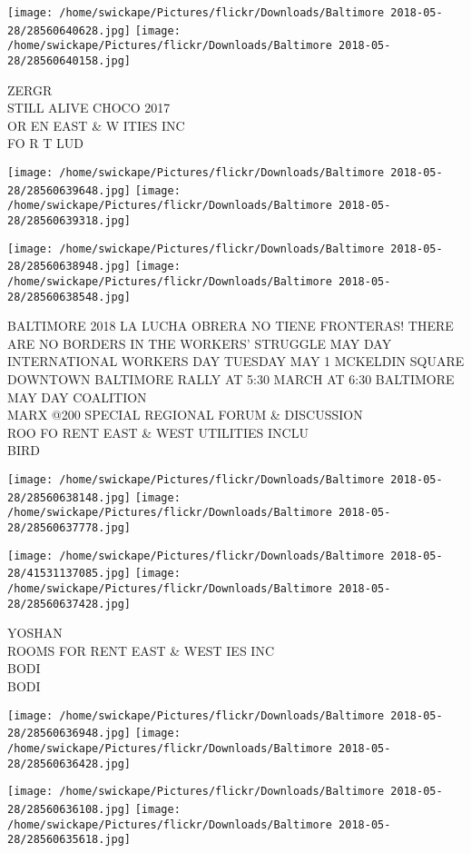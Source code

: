\documentclass[10pt,letterpaper]{article}
\begin{document}
\texttt{[image: /home/swickape/Pictures/flickr/Downloads/Baltimore 2018-05-28/28560640628.jpg]}
\texttt{[image: /home/swickape/Pictures/flickr/Downloads/Baltimore 2018-05-28/28560640158.jpg]}

ZERGR\\
STILL ALIVE CHOCO 2017\\
OR EN EAST \& W ITIES INC\\
FO R T LUD
\pagebreak

\texttt{[image: /home/swickape/Pictures/flickr/Downloads/Baltimore 2018-05-28/28560639648.jpg]}
\texttt{[image: /home/swickape/Pictures/flickr/Downloads/Baltimore 2018-05-28/28560639318.jpg]}

\texttt{[image: /home/swickape/Pictures/flickr/Downloads/Baltimore 2018-05-28/28560638948.jpg]}
\texttt{[image: /home/swickape/Pictures/flickr/Downloads/Baltimore 2018-05-28/28560638548.jpg]}

BALTIMORE 2018 LA LUCHA OBRERA NO TIENE FRONTERAS!  THERE ARE NO BORDERS IN THE WORKERS' STRUGGLE MAY DAY INTERNATIONAL WORKERS DAY TUESDAY MAY 1 MCKELDIN SQUARE DOWNTOWN BALTIMORE RALLY AT 5:30 MARCH AT 6:30 BALTIMORE MAY DAY COALITION\\
MARX @200 SPECIAL REGIONAL FORUM \& DISCUSSION\\
ROO FO RENT EAST \& WEST UTILITIES INCLU\\
BIRD
\pagebreak

\texttt{[image: /home/swickape/Pictures/flickr/Downloads/Baltimore 2018-05-28/28560638148.jpg]}
\texttt{[image: /home/swickape/Pictures/flickr/Downloads/Baltimore 2018-05-28/28560637778.jpg]}

\texttt{[image: /home/swickape/Pictures/flickr/Downloads/Baltimore 2018-05-28/41531137085.jpg]}
\texttt{[image: /home/swickape/Pictures/flickr/Downloads/Baltimore 2018-05-28/28560637428.jpg]}

YOSHAN\\
ROOMS FOR RENT EAST \& WEST IES INC\\
BODI\\
BODI
\pagebreak

\texttt{[image: /home/swickape/Pictures/flickr/Downloads/Baltimore 2018-05-28/28560636948.jpg]}
\texttt{[image: /home/swickape/Pictures/flickr/Downloads/Baltimore 2018-05-28/28560636428.jpg]}

\texttt{[image: /home/swickape/Pictures/flickr/Downloads/Baltimore 2018-05-28/28560636108.jpg]}
\texttt{[image: /home/swickape/Pictures/flickr/Downloads/Baltimore 2018-05-28/28560635618.jpg]}
\end{document}

